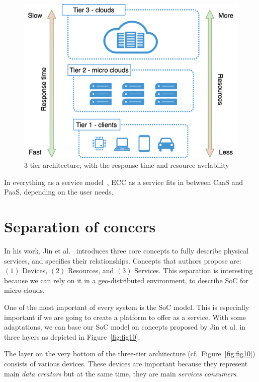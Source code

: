 \begin{figure}[H]
	\includegraphics[width=\linewidth]{images/Figure9}
	\vspace{-0.7cm}
	\caption{3 tier architecture, with the response time and resource avelability}
	\label{fig:fig9}
\end{figure}

In everything as a service model~\cite{DuanFZSNH15}, ECC as a service fits in between CaaS and PaaS, depending on the user needs. 
%
%
\section{Separation of concers}\label{sec:separation_of_concerns}
%
In his work, Jin et al.~\cite{JinCJL14} introduces three core concepts to fully describe physical services, and specifies their relationships. Concepts that authors propose are: $(1)$ Devices, $(2)$ Resources, and $(3)$ Services. This separation is interesting because we can rely on it in a geo-distributed environment, to describe SoC for micro-clouds.

One of the most important of every system is the SoC model. This is especially important if we are going to create a platform to offer as a service. With some adaptations, we can base our SoC model on concepts proposed by Jin et al. in three layers as depicted in Figure~\ref{fig:fig10}. 

The layer on the very bottom of the three-tier architecture (cf.~Figure~\ref{fig:fig10}) consists of various devices. These devices are important because they represent main \textit{data creators} but at the same time, they are main \textit{services consumers}. 

